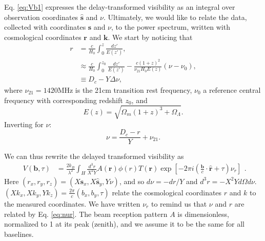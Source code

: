 \documentclass[twocolumn,apj,numberedappendix]{emulateapj}
\renewcommand\[{\begin{equation}}
\renewcommand\]{\end{equation}}
\begin{document}
Eq. \eqref{eq:Vb1} expresses the delay-transformed visibility as
an integral over observation coordinates $\hat{\boldsymbol{s}}$ and $\nu$. Ultimately,
we would like to relate the data, collected with coordinates $\hat{\boldsymbol{s}}$
and $\nu$, to the power spectrum, written with cosmological coordinates
$\boldsymbol{r}$ and $\boldsymbol{k}$. We start by noticing that
\[
\begin{aligned}r & =\frac{c}{H_{0}}\int_{0}^{z}\frac{dz'}{E(z')},\\
 & \approx\frac{c}{H_{0}}\int_{0}^{z_{0}}\frac{dz'}{E(z')}-\frac{c(1+z)^{2}}{\nu_{21}H_{0}E(z)}\left(\nu-\nu_{0}\right),\\
 & \equiv D_{c}-Y\Delta\nu,
\end{aligned}
\]
where $\nu_{21}=1420$MHz is the 21cm transition rest frequency, $\nu_{0}$
a reference central frequency with corresponding redshift $z_{0}$,
and 
\[
E(z)=\sqrt{\Omega_{m}(1+z)^{3}+\Omega_{\Lambda}}.
\]
Inverting for $\nu$:
\begin{equation}
\nu=\frac{D_{c}-r}{Y}+\nu_{21}.\label{eq:nur}
\end{equation}


We can thus rewrite the delayed transformed visibility as 
\small
\[
\begin{aligned}V(\boldsymbol{b},\tau) & =\frac{2k_{B}}{\lambda^{2}}\int_{H}\frac{d^{3}r}{X^{2}Y}A(\boldsymbol{r})\phi(r)T(\boldsymbol{r})\exp\left[-2\pi i\left(\frac{\boldsymbol{b}}{c}\cdot\hat{\boldsymbol{r}}+\tau\right)\nu_{r}\right]\end{aligned}.
\]
\normalsize
Here $(r_{x},r_{y},r_{z})=(X\hat{\boldsymbol{s}}_{x},X\hat{\boldsymbol{s}}_{y},Y\nu)$, and so $d\nu=-dr/Y$ and $d^{3}r=-X^{2}Yd\Omega d\nu$. 
$(Xk_{x},Xk_{y},Yk_{z})=\frac{2\pi}{c}(b_{x},b_{y},\tau)$ relate
the cosmological coordinates $r$ and $k$ to the measured coordinates.
We have written $\nu_{r}$ to remind us that $\nu$ and $r$ are related
by Eq. \eqref{eq:nur}. The beam reception pattern $A$ is dimensionless,
normalized to 1 at its peak (zenith), and we assume it to be the same
for all baselines. 
\end{document}
